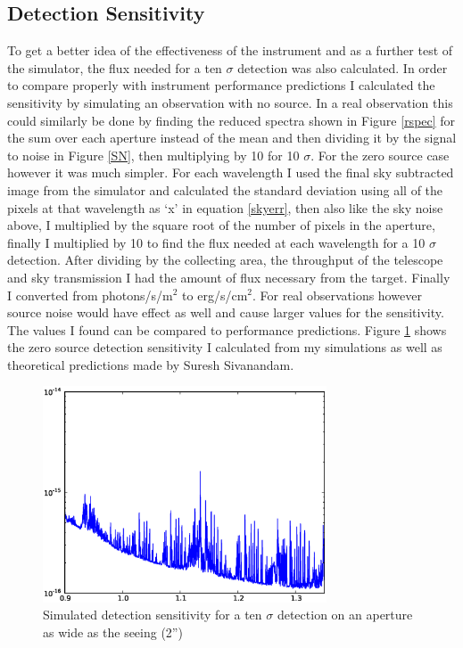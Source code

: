 \documentclass[11pt,twoside]{article}
\begin{document}
\subsection{Detection Sensitivity}

To get a better idea of the effectiveness of the instrument and as a further test of the simulator, the flux needed for a ten $\sigma$ detection was also calculated. In order to compare properly with instrument performance predictions I calculated the sensitivity by simulating an observation with no source. In a real observation this could similarly be done by finding the reduced spectra shown in Figure \ref{rspec} for the sum over each aperture instead of the mean and then dividing it by  the signal to noise in Figure \ref{SN}, then multiplying by 10 for 10 $\sigma$. For the zero source case however it was much simpler. For each wavelength I used the final sky subtracted image from the simulator and calculated the standard deviation using all of the pixels at that wavelength as `x' in equation \ref{skyerr}, then also like the sky noise above, I multiplied by the square root of the number of pixels in the aperture, finally I multiplied by 10 to find the flux needed at each wavelength for a 10 $\sigma$ detection. After dividing by the collecting area, the throughput of the telescope and sky transmission I had the amount of flux necessary from the target. Finally I converted from photons/s/m$^2$ to erg/s/cm$^2$. For real observations however source noise would have effect as well and cause larger values for the sensitivity. The values I found can be compared to performance predictions. Figure \ref{sensitive} shows the zero source detection sensitivity I calculated from my simulations as well as theoretical predictions made by Suresh Sivanandam.

\begin{figure}
\centering
\includegraphics[width=0.75\textwidth]{nosource_sensitivity}
\caption{Simulated detection sensitivity for a ten $\sigma$ detection on an aperture as wide as the seeing (2'')} 
\label{sensitive}
\end{figure}
\end{document}
